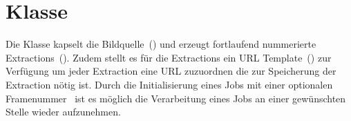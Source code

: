 \section{Klasse }
Die Klasse  kapselt die Bildquelle~() und erzeugt fortlaufend nummerierte Extractions~().
Zudem stellt es für die Extractions ein URL Template~() zur Verfügung um jeder Extraction eine URL zuzuordnen die zur Speicherung der Extraction nötig ist.
Durch die Initialisierung eines Jobs mit einer optionalen Framenummer~ ist es möglich die Verarbeitung eines Jobs an einer gewünschten Stelle wieder aufzunehmen.



